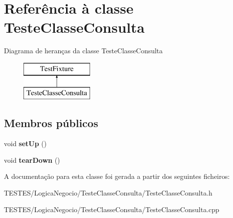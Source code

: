 \hypertarget{class_teste_classe_consulta}{\section{Referência à classe Teste\-Classe\-Consulta}
\label{class_teste_classe_consulta}
}
Diagrama de heranças da classe Teste\-Classe\-Consulta\begin{figure}[H]
\begin{center}
\leavevmode
\includegraphics[height=2.000000cm]{class_teste_classe_consulta}
\end{center}
\end{figure}
\subsection*{Membros públicos}
\begin{DoxyCompactItemize}
\item 
\hypertarget{class_teste_classe_consulta_a8b05d79dac7c478b1996bf318e9dcb83}{void {\bfseries set\-Up} ()}\label{class_teste_classe_consulta_a8b05d79dac7c478b1996bf318e9dcb83}

\item 
\hypertarget{class_teste_classe_consulta_a3b9b5c664639de4965cadd0fd2d95402}{void {\bfseries tear\-Down} ()}\label{class_teste_classe_consulta_a3b9b5c664639de4965cadd0fd2d95402}

\end{DoxyCompactItemize}


A documentação para esta classe foi gerada a partir dos seguintes ficheiros\-:\begin{DoxyCompactItemize}
\item 
T\-E\-S\-T\-E\-S/\-Logica\-Negocio/\-Teste\-Classe\-Consulta/Teste\-Classe\-Consulta.\-h\item 
T\-E\-S\-T\-E\-S/\-Logica\-Negocio/\-Teste\-Classe\-Consulta/Teste\-Classe\-Consulta.\-cpp\end{DoxyCompactItemize}
